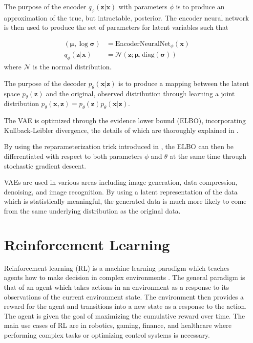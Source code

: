 The purpose of the encoder $q_\phi(\boldsymbol{z}|\boldsymbol{x})$ with parameters $\phi$ is to produce an approximation of the true, but intractable, posterior.
The encoder neural network is then used to produce the set of parameters for latent variables such that

\begin{align}
	(\boldsymbol{\mu}, \log \boldsymbol{\sigma}) &= \text{EncoderNeuralNet}_\phi (\boldsymbol{x})\\
	q_\phi(\boldsymbol{z}|\boldsymbol{x}) &= \mathcal{N}(\boldsymbol{z}; \boldsymbol{\mu}, \text{diag}(\boldsymbol{\sigma}))
\end{align}
where $\mathcal{N}$ is the normal distribution.

The purpose of the decoder $p_\theta (\boldsymbol{x}|\boldsymbol{z})$ is to produce a mapping between the latent space $p_\theta (\boldsymbol{z})$ and the original, observed distribution through learning a joint distribution $p_\theta (\boldsymbol{x}, \boldsymbol{z}) = p_\theta (\boldsymbol{z})p_\theta (\boldsymbol{x}|\boldsymbol{z})$.

The VAE is optimized through the evidence lower bound (ELBO), incorporating Kullback-Leibler divergence, the details of which are thoroughly explained in \cite{kingma2019introduction}.

By using the reparameterization trick introduced in \cite{kingma2013auto}, the ELBO can then be differentiated with respect to both parameters $\phi$ and $\theta$ at the same time through stochastic gradient descent.

VAEs are used in various areas including image generation, data compression, denoising, and image recognition.
By using a latent representation of the data which is statistically meaningful, the generated data is much more likely to come from the same underlying distribution as the original data.

\section{Reinforcement Learning} \label{sec:background-rl}

Reinforcement learning (RL) is a machine learning paradigm which teaches agents how to make decision in complex environments \cite{tavakol2022dic}.
The general paradigm is that of an agent which takes actions in an environment as a response to its observations of the current environment state.
The environment then provides a reward for the agent and transitions into a new state as a response to the action.
The agent is given the goal of maximizing the cumulative reward over time.
The main use cases of RL are in robotics, gaming, finance, and healthcare where performing complex tasks or optimizing control systems is necessary.

